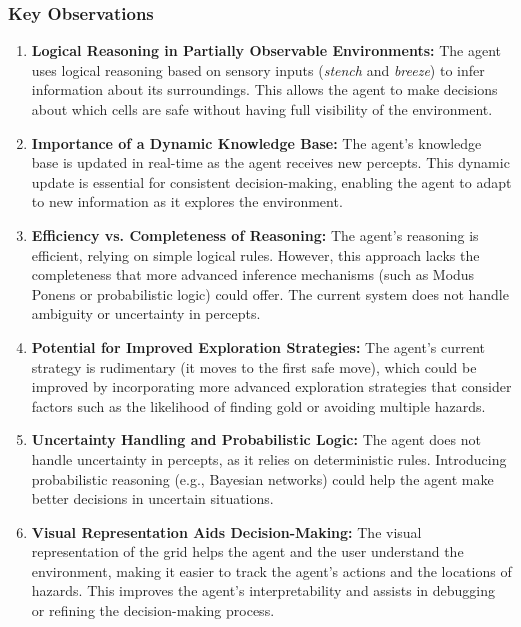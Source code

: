 \documentclass[12pt]{article}
\begin{document}
\subsubsection{Key Observations}
\begin{enumerate}
    \item \textbf{Logical Reasoning in Partially Observable Environments:} The agent uses logical reasoning based on sensory inputs (\textit{stench} and \textit{breeze}) to infer information about its surroundings. This allows the agent to make decisions about which cells are safe without having full visibility of the environment.
    
    \item \textbf{Importance of a Dynamic Knowledge Base:} The agent’s knowledge base is updated in real-time as the agent receives new percepts. This dynamic update is essential for consistent decision-making, enabling the agent to adapt to new information as it explores the environment.
    
    \item \textbf{Efficiency vs. Completeness of Reasoning:} The agent’s reasoning is efficient, relying on simple logical rules. However, this approach lacks the completeness that more advanced inference mechanisms (such as Modus Ponens or probabilistic logic) could offer. The current system does not handle ambiguity or uncertainty in percepts.
    
    \item \textbf{Potential for Improved Exploration Strategies:} The agent’s current strategy is rudimentary (it moves to the first safe move), which could be improved by incorporating more advanced exploration strategies that consider factors such as the likelihood of finding gold or avoiding multiple hazards.
    
    \item \textbf{Uncertainty Handling and Probabilistic Logic:} The agent does not handle uncertainty in percepts, as it relies on deterministic rules. Introducing probabilistic reasoning (e.g., Bayesian networks) could help the agent make better decisions in uncertain situations.
    
    \item \textbf{Visual Representation Aids Decision-Making:} The visual representation of the grid helps the agent and the user understand the environment, making it easier to track the agent’s actions and the locations of hazards. This improves the agent's interpretability and assists in debugging or refining the decision-making process.
\end{enumerate}
\end{document}
